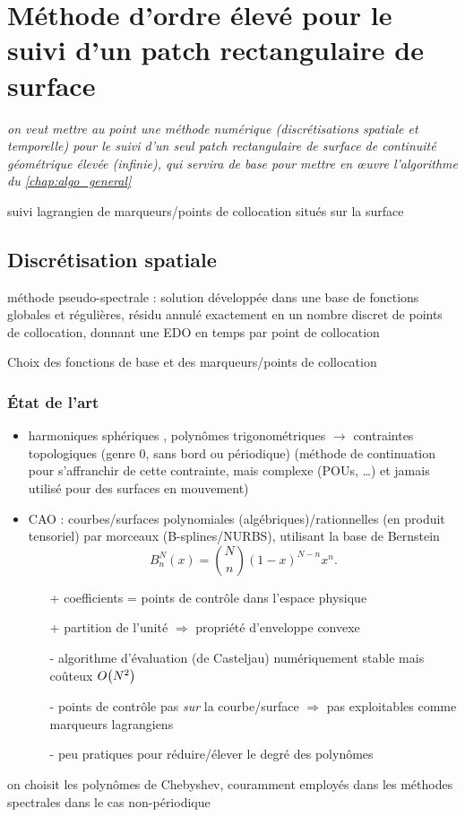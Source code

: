 \chapter{Méthode d'ordre élevé pour le suivi d'un patch rectangulaire de surface}
\label{chap:methode_ps}

\textit{on veut mettre au point une méthode numérique (discrétisations spatiale et temporelle) pour le suivi d'un seul patch rectangulaire de surface de continuité géométrique élevée (infinie), qui servira de base pour  mettre en \oe uvre l'algorithme du \autoref{chap:algo_general}}
\par\bigskip


suivi lagrangien de marqueurs/points de collocation situés sur la surface

\section{Discrétisation spatiale}
méthode pseudo-spectrale : solution développée dans une base de fonctions globales et régulières, résidu annulé exactement en un nombre discret de points de collocation, donnant une EDO en temps par point de collocation\par
Choix des fonctions de base et des marqueurs/points de collocation

\subsection{État de l'art}
\begin{itemize}
	\item harmoniques sphériques \cite{veerapaneni2011}, polynômes trigonométriques \cite{gueyffier2015} $\to$ contraintes topologiques (genre 0, sans bord ou périodique) (méthode de continuation \cite{bruno2007} pour s'affranchir de cette contrainte, mais complexe (POUs, \ldots) et jamais utilisé pour des surfaces en mouvement)
	\item CAO : courbes/surfaces polynomiales (algébriques)/rationnelles (en produit tensoriel) par morceaux (B-splines/NURBS), utilisant la base de Bernstein
	\begin{equation}
		B_n^N(x) = \binom{N}{n} \left( 1 - x \right)^{N-n} x^n.
	\end{equation}
	\begin{itemize}
		\item[+] coefficients = points de contrôle dans l'espace physique
		\item[+] partition de l'unité $\Rightarrow$ propriété d'enveloppe convexe
		\item[-] algorithme d'évaluation (de Casteljau) numériquement stable mais coûteux $O\!\left( {N^2} \right)$
		\item[-] points de contrôle pas \emph{sur} la courbe/surface $\Rightarrow$ pas exploitables comme marqueurs lagrangiens
		\item[-] peu pratiques pour réduire/élever le degré des polynômes
	\end{itemize}
\end{itemize}
\bigskip
on choisit les polynômes de Chebyshev, couramment employés dans les méthodes spectrales dans le cas non-périodique
